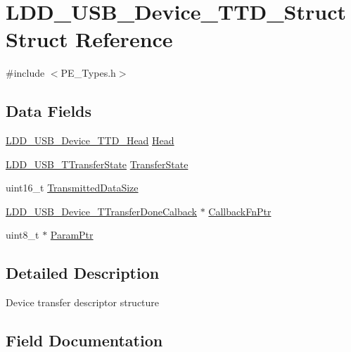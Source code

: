 \hypertarget{struct_l_d_d___u_s_b___device___t_t_d___struct}{}\section{L\+D\+D\+\_\+\+U\+S\+B\+\_\+\+Device\+\_\+\+T\+T\+D\+\_\+\+Struct Struct Reference}
\label{struct_l_d_d___u_s_b___device___t_t_d___struct}


{\ttfamily \#include $<$P\+E\+\_\+\+Types.\+h$>$}

\subsection*{Data Fields}
\begin{DoxyCompactItemize}
\item 
\hyperlink{group___p_e___types__module_gac26d0354d0c874cd4e4580525d70c0c1}{L\+D\+D\+\_\+\+U\+S\+B\+\_\+\+Device\+\_\+\+T\+T\+D\+\_\+\+Head} \hyperlink{struct_l_d_d___u_s_b___device___t_t_d___struct_a7f3947a676f6ecd32e3fb342b7f07a35}{Head}
\item 
\hyperlink{group___p_e___types__module_gacf5f7e704d87aba90dc002ed7c0d28b4}{L\+D\+D\+\_\+\+U\+S\+B\+\_\+\+T\+Transfer\+State} \hyperlink{struct_l_d_d___u_s_b___device___t_t_d___struct_aca23e3743f56dc73206b79f885e9130f}{Transfer\+State}
\item 
uint16\+\_\+t \hyperlink{struct_l_d_d___u_s_b___device___t_t_d___struct_aeffbf1300fce5fc9ebf98f5760a96d38}{Transmitted\+Data\+Size}
\item 
\hyperlink{group___p_e___types__module_gab5ef2ca4158b9df48e6fd17ec847020a}{L\+D\+D\+\_\+\+U\+S\+B\+\_\+\+Device\+\_\+\+T\+Transfer\+Done\+Calback} $\ast$ \hyperlink{struct_l_d_d___u_s_b___device___t_t_d___struct_aaff3a74a2abea1e6b530ecfdaff8c584}{Callback\+Fn\+Ptr}
\item 
uint8\+\_\+t $\ast$ \hyperlink{struct_l_d_d___u_s_b___device___t_t_d___struct_ab1f3a3912ae70d748c5891aa91804de4}{Param\+Ptr}
\end{DoxyCompactItemize}


\subsection{Detailed Description}
Device transfer descriptor structure 

\subsection{Field Documentation}
\hypertarget{struct_l_d_d___u_s_b___device___t_t_d___struct_aaff3a74a2abea1e6b530ecfdaff8c584}{}
